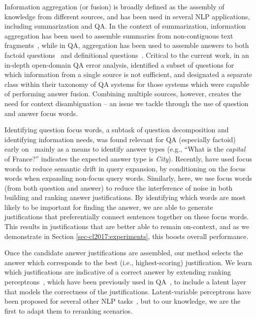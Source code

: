 Information aggregation (or fusion) is broadly defined as the assembly of knowledge from different sources, and has been used in several NLP applications, including summarization and QA.  In the context of summarization, information aggregation has been used to assemble summaries from non-contiguous text fragments~\citep[inter alia]{barzilay1999information,barzilay2005sentence}, while in QA, aggregation has been used to assemble answers to both factoid questions~\citep{pradhan2002building} and definitional questions~\citep{blair2003hybrid}.  Critical to the current work, in an in-depth open-domain QA error analysis, \citet{Moldovan:2003:PIE:763693.763694} identified a subset of questions for which information from a single source is not sufficient, and designated a separate class within their taxonomy of QA systems for those systems which were capable of performing answer fusion. Combining multiple sources, however, creates the need for context disambiguation -- an issue we tackle through the use of question and answer focus words.

Identifying question focus words, a subtask of question decomposition and identifying information needs, was found relevant for QA (especially factoid) early on~\citep[inter alia]{Harabagiu:00,Moldovan:2003:PIE:763693.763694} mainly as a means to identify answer types (e.g., ``What is the {\em capital} of France?'' indicates the expected answer type is \emph{City}).  
Recently, \citet{Park:2015} have used focus words to reduce semantic drift in query expansion, by conditioning on the focus words when expanding non-focus query words.
Similarly, here, we use focus words (from both question and answer) to reduce the interference of noise in both building and ranking answer justifications.  By identifying which words are most likely to be important for finding the answer, we are able to generate justifications that preferentially connect sentences together on these focus words.  This results in justifications that are better able to remain on-context, and as we demonstrate in Section \ref{sec-cl2017:experiments}, this boosts overall performance. 

Once the candidate answer justifications are assembled, our method selects the answer which corresponds to the best (i.e., highest-scoring) justification.  We learn which justifications are indicative of a correct answer by extending ranking perceptrons~\citep{Shen:Joshi:2005}, which have been previously used in QA~\citep{Surdeanu:11}, to include a latent layer that models the correctness of the justifications. Latent-variable perceptrons have been proposed for several other NLP tasks~\citep{liang2006end,zettlemoyer2007online,sun2009latent,hoffmann2011knowledge,fernandes2012latent,bjorkelund2014learning}, but to our knowledge, we are the first to adapt them to reranking scenarios. 

